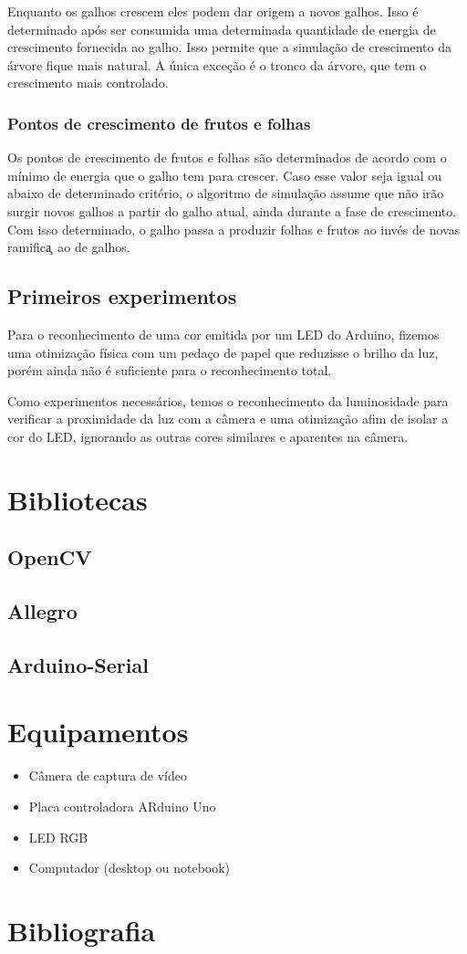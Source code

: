 \documentclass[12pt]{article}
\begin{document}
Enquanto os galhos crescem eles podem dar origem a novos galhos. Isso \'e determinado ap\'os ser consumida uma determinada
quantidade de energia de crescimento fornecida ao galho. Isso permite que a simula\c c\~ao de crescimento da \'arvore
fique mais natural. A \'unica exce\c c\~ao \'e o tronco da \'arvore, que tem o crescimento
mais controlado.

\subsubsection{Pontos de crescimento de frutos e folhas}
Os pontos de crescimento de frutos e folhas s\~ao determinados de acordo com o m\'inimo de energia que o galho
tem para crescer. Caso esse valor seja igual ou abaixo de determinado crit\'erio, o algoritmo de simula\c c\~ao assume
que n\~ao ir\~ao surgir novos galhos a partir do galho atual, ainda durante a fase de crescimento. Com isso determinado,
o galho passa a produzir folhas e frutos ao inv\'es de novas ramifica\c~ao de galhos.

\subsection{Primeiros experimentos}
Para o reconhecimento de uma cor emitida por um LED do Arduino, fizemos uma otimiza\c c\~ao f\'isica
com um peda\c co de papel que reduzisse o brilho da luz, por\'em ainda n\~ao \'e suficiente para
o reconhecimento total.

Como experimentos necess\'arios, temos o reconhecimento da luminosidade para verificar
a proximidade da luz com a c\^amera e uma otimiza\c c\~ao afim de isolar a cor do LED,
ignorando as outras cores similares e aparentes na c\^amera.

\section{Bibliotecas}
\subsection{OpenCV}
\subsection{Allegro}
\subsection{Arduino-Serial}

\section{Equipamentos}
\begin{itemize}
\item C\^amera de captura de v\'ideo
\item Placa controladora ARduino Uno
\item LED RGB
\item Computador (desktop ou notebook)
\end{itemize}

\nocite{*}

\section{Bibliografia}


\end{document}
